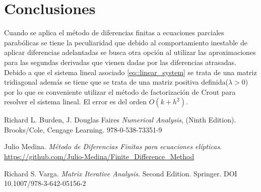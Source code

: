 \documentclass[a4paper]{article}
\begin{document}
\section{Conclusiones}
Cuando se aplica el método de diferencias finitas a ecuaciones parciales parabólicas se tiene la peculiaridad que debido al comportamiento inestable de aplicar diferencias adelantadas se busca otra opción al utilizar las aproximaciones para las segundas derivadas que vienen dadas por las diferencias atrasadas. Debido a que el sistema lineal asociado \ref{eq::linear_system} se trata de una matriz tridiagonal además se tiene que se trata de una matriz positiva definida($\lambda>0$) por lo que es conveniente utilizar el método de factorización de Crout para resolver el sistema lineal. El error es del orden $O(k+h^2)$.


\begin{thebibliography}{99}


 Richard L. Burden, J. Douglas Faires \textit{Numerical Analysis}, (Ninth Edition). Brooks/Cole, Cengage Learning. 978-0-538-73351-9

 Julio Medina. \textit{Método de Diferencias Finitas para ecuaciones elípticas}. \url{https://github.com/Julio-Medina/Finite_Difference_Method}

 Richard S. Varga. \textit{Matrix Iterative Analysis}. Second Edition. Springer. DOI 10.1007/978-3-642-05156-2






\end{thebibliography}
\end{document}
